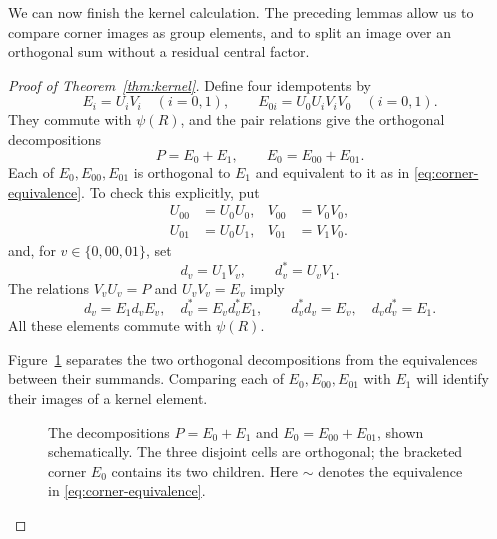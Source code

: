 We can now finish the kernel calculation.  The preceding lemmas
allow us to compare corner images as group elements, and to split
an image over an orthogonal sum without a residual central factor.

\begin{proof}[Proof of Theorem~\ref{thm:kernel}]
Define four idempotents by
\[
 E_i=U_iV_i\quad(i=0,1),\qquad
 E_{0i}=U_0U_iV_iV_0\quad(i=0,1).
\]
They commute with $\psi(R)$, and the pair relations give the
orthogonal decompositions
\begin{equation}\label{eq:four-corner-splits}
 P=E_0+E_1,\qquad E_0=E_{00}+E_{01}.
\end{equation}
Each of $E_0,E_{00},E_{01}$ is orthogonal to $E_1$ and equivalent
to it as in \eqref{eq:corner-equivalence}.  To check this explicitly,
put
\[
 \begin{aligned}
 U_{00}&=U_0U_0,& V_{00}&=V_0V_0,\\
 U_{01}&=U_0U_1,& V_{01}&=V_1V_0.
 \end{aligned}
\]
and, for $v\in\{0,00,01\}$, set
\[
 d_v=U_1V_v,\qquad d_v^*=U_vV_1.
\]
The relations $V_vU_v=P$ and $U_vV_v=E_v$ imply
\[
 d_v=E_1d_vE_v,\quad d_v^*=E_vd_v^*E_1,
 \qquad d_v^*d_v=E_v,\quad d_vd_v^*=E_1.
\]
All these elements commute with $\psi(R)$.

Figure~\ref{fig:kernel-corners} separates the two orthogonal
decompositions from the equivalences between their summands. Comparing
each of $E_0,E_{00},E_{01}$ with $E_1$ will identify their images
of a kernel element.

\begin{figure}[ht]
\centering
{}
\caption{The decompositions $P=E_0+E_1$ and $E_0=E_{00}+E_{01}$,
shown schematically. The three disjoint cells are orthogonal; the
bracketed corner $E_0$ contains its two children. Here $\sim$ denotes
the equivalence in \eqref{eq:corner-equivalence}.}
\label{fig:kernel-corners}
\end{figure}


\end{proof}
